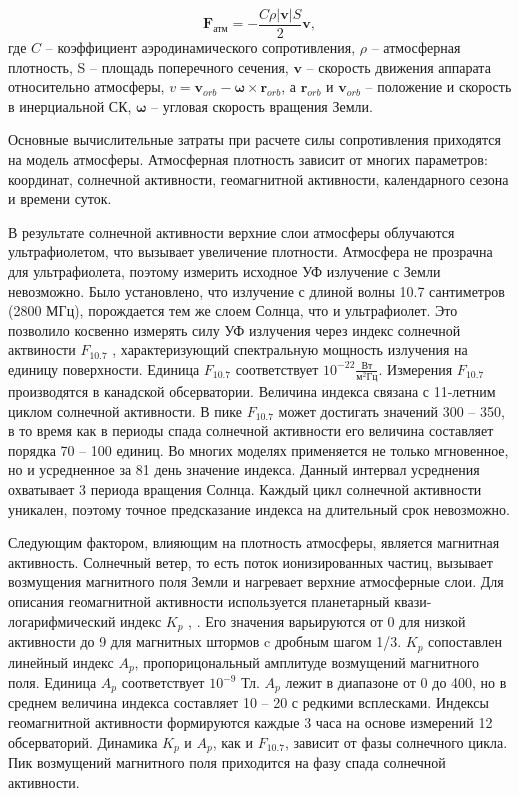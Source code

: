 \begin{equation*}
    \mathbf{F}_{\text{атм}} = - \frac{C \rho |\mathbf{v}| S}{2} \mathbf{v},
\end{equation*}
где $C$ -- коэффициент аэродинамического сопротивления, $\rho$ -- атмосферная плотность, 
S -- площадь поперечного сечения, 
$\mathbf{v}$ -- скорость движения аппарата относительно атмосферы, 
$v = \mathbf{v}_{orb} - \mathbf{\omega} \times \mathbf{r}_{orb}$, а
$\mathbf{r}_{orb}$ и $\mathbf{v}_{orb}$  -- положение и скорость в инерциальной СК,
$\mathbf{\omega}$ -- угловая скорость вращения Земли.

Основные вычислительные затраты при расчете силы сопротивления приходятся на модель атмосферы.
Атмосферная плотность зависит от многих параметров: координат, солнечной активности,
геомагнитной активности, календарного сезона и времени суток.

В результате солнечной активности верхние слои атмосферы облучаются ультрафиолетом,
что вызывает увеличение плотности. Атмосфера не прозрачна для ультрафиолета,
поэтому измерить исходное УФ излучение с Земли невозможно. Было установлено, что
излучение с длиной волны 10.7 сантиметров (2800 МГц), порождается тем же слоем Солнца, что и
ультрафиолет. Это позволило косвенно измерять силу УФ излучения через индекс
солнечной актвиности $F_{10.7}$ \cite{Tapping2013}, характеризующий спектральную мощность излучения на единицу поверхности. Единица $F_{10.7}$ соответствует
$10^{-22} \frac{\text{Вт}}{\text{м}^2 \text{Гц}}$. 
Измерения $F_{10.7}$ производятся в канадской обсерватории. 
Величина индекса связана с 11-летним циклом солнечной активности. 
В пике $F_{10.7}$ может достигать значений 300 -- 350, в то время как в периоды спада
солнечной активности его величина составляет порядка 70 -- 100 единиц. 
Во многих моделях применяется не только мгновенное, но и усредненное за 81 день значение индекса.
Данный интервал усреднения охватывает 3 периода вращения Солнца. 
Каждый цикл солнечной активности уникален, 
поэтому точное предсказание индекса на длительный срок невозможно.

Следующим фактором, влияющим на плотность атмосферы, является магнитная активность.
Солнечный ветер, то есть поток ионизированных частиц, 
вызывает возмущения магнитного поля Земли и нагревает верхние атмосферные слои.
Для описания геомагнитной активности используется планетарный квази-логарифмический индекс $K_p$
\cite{Bartels1949}, \cite{Matzka2021}.
Его значения варьируются от 0 для низкой активности до 9 для магнитных штормов c дробным шагом 1/3. 
$K_p$ сопоставлен линейный индекс $A_p$, пропорицональный амплитуде возмущений магнитного поля.
Единица $A_p$ соответствует $10^{-9}$ Тл. $A_p$ лежит в диапазоне от 0 до 400, но в среднем величина индекса составляет 10 -- 20 с редкими всплесками.
Индексы геомагнитной активности формируются каждые 3 часа на основе измерений 12 обсерваторий.
Динамика $K_p$ и $A_p$, как и $F_{10.7}$, зависит от фазы солнечного цикла.
Пик возмущений магнитного поля приходится на фазу спада солнечной активности.

